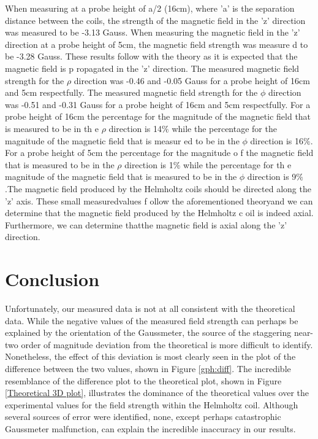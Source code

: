 \documentclass[a4paper]{article}
\begin{document}
\qq When measuring at a probe height of a/2 (16cm), where 'a' is the separation
distance between the coils, the strength of the magnetic field in the 'z'
direction was measured to be -3.13 Gauss. When measuring the magnetic field in
the 'z' direction at a probe height of 5cm, the magnetic field strength was
measure d to be -3.28 Gauss. These results follow with the theory as it is
expected that the magnetic field is p ropagated in the 'z' direction. The
measured magnetic field strength for the $\rho$ direction was -0.46 and -0.05
Gauss for a probe height of 16cm and 5cm respectfully. The measured magnetic
field strength for the $\phi$ direction was -0.51 and -0.31 Gauss for a probe
height of 16cm and 5cm respectfully. For a probe height of 16cm the percentage
for the magnitude of the magnetic field that is measured to be in th e $\rho$
direction is 14$\%$ while the percentage for the magnitude of the magnetic field
that is measur ed to be in the $\phi$ direction is 16$\%$. For a probe height of
5cm the percentage for the magnitude o f the magnetic field that is measured to
be in the $\rho$ direction is 1$\%$ while the percentage for th e magnitude of
the magnetic field that is measured to be in the $\phi$ direction is 9$\%$.The
magnetic field produced by the Helmholtz coils should be directed along the 'z'
axis. These small measuredvalues f ollow the aforementioned theoryand we can
determine that the magnetic field produced by the Helmholtz c oil is indeed
axial. Furthermore, we can determine thatthe magnetic field is axial along the
'z' direction.

\section{Conclusion}
\qq Unfortunately, our measured data is not at all consistent with the
theoretical data. While the negative values of the measured field strength can
perhaps be explained by the orientation of the Gaussmeter, the source of the
staggering near-two order of magnitude deviation from the theoretical is more
difficult to identify. Nonetheless, the effect of this deviation is most
clearly seen in the plot of the difference between the two values, shown in
Figure \ref{gph:diff}. The incredible resemblance of the difference plot to the
theoretical plot, shown in Figure \ref{Theoretical 3D plot}, illustrates the
dominance of the theoretical values over the experimental values for the field
strength within the Helmholtz coil. Although several sources of error were
identified, none, except perhaps catastrophic Gaussmeter malfunction, can
explain the incredible inaccuracy in our results.
\end{document}
